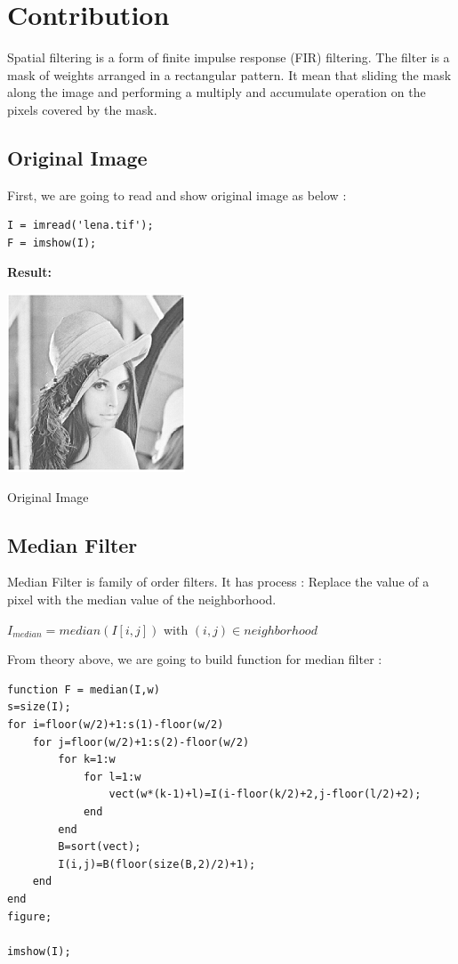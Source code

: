 \chapter{Contribution}
Spatial filtering is a form of finite impulse response (FIR) filtering. The filter is a mask of weights arranged
in a rectangular pattern. It mean that sliding the mask along the image and performing a multiply and
accumulate operation on the pixels covered by the mask.

\section*{Original Image }
First, we are going to read and show original image as below :
\begin{lstlisting}
I = imread('lena.tif');
F = imshow(I);
\end{lstlisting}

\textbf{Result:}
\begin{center}
	\includegraphics{lena1.png}

 Original Image
\end{center}

\section{Median Filter}
Median Filter is family of order filters. It has process : Replace the value of a pixel with the median value of the neighborhood.

$I_{median} = median(I[i,j])$  with $(i,j)\in neighborhood$

From theory above, we are going to build function for median filter :

\begin{lstlisting}
function F = median(I,w)
s=size(I);
for i=floor(w/2)+1:s(1)-floor(w/2)
	for j=floor(w/2)+1:s(2)-floor(w/2)
		for k=1:w
			for l=1:w
				vect(w*(k-1)+l)=I(i-floor(k/2)+2,j-floor(l/2)+2);
			end
		end
		B=sort(vect);
		I(i,j)=B(floor(size(B,2)/2)+1);
	end
end
figure;

imshow(I);

\end{lstlisting}


